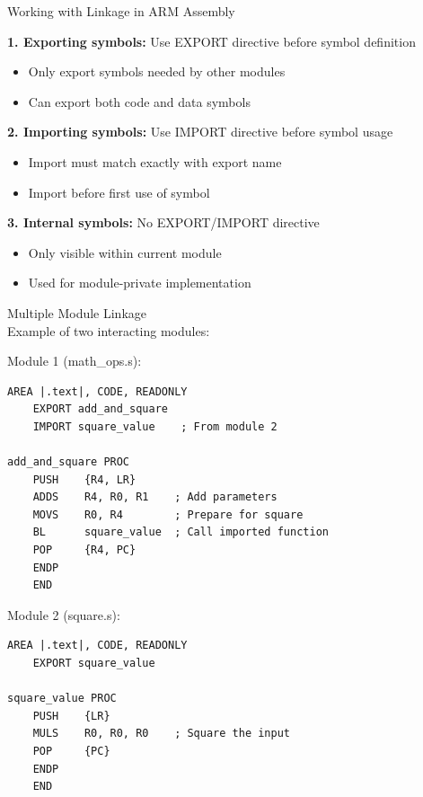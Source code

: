 \begin{KR}{Working with Linkage in ARM Assembly}

\textbf{1. Exporting symbols:} Use EXPORT directive before symbol definition
\begin{itemize}
  \item Only export symbols needed by other modules
  \item Can export both code and data symbols
\end{itemize}

\textbf{2. Importing symbols:} Use IMPORT directive before symbol usage
\begin{itemize}
  \item Import must match exactly with export name
  \item Import before first use of symbol
\end{itemize}

\textbf{3. Internal symbols:} No EXPORT/IMPORT directive
\begin{itemize}
  \item Only visible within current module
  \item Used for module-private implementation
\end{itemize}
\end{KR}


\begin{example2}{Multiple Module Linkage}\\
Example of two interacting modules:

Module 1 (math\_ops.s):
\begin{lstlisting}[language=armasm, style=basesmol]
    AREA |.text|, CODE, READONLY
    EXPORT add_and_square
    IMPORT square_value    ; From module 2
    
add_and_square PROC
    PUSH    {R4, LR}
    ADDS    R4, R0, R1    ; Add parameters
    MOVS    R0, R4        ; Prepare for square
    BL      square_value  ; Call imported function
    POP     {R4, PC}
    ENDP
    END
\end{lstlisting}

Module 2 (square.s):
\begin{lstlisting}[language=armasm, style=basesmol]
    AREA |.text|, CODE, READONLY
    EXPORT square_value
    
square_value PROC
    PUSH    {LR}
    MULS    R0, R0, R0    ; Square the input
    POP     {PC}
    ENDP
    END
\end{lstlisting}
\end{example2}


